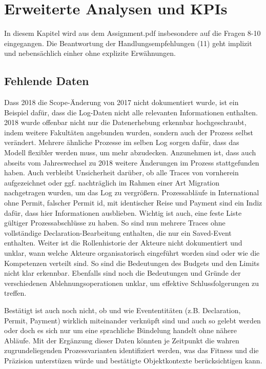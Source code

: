\section{Erweiterte Analysen und KPIs}
\label{sec:erweitert}
In diesem Kapitel wird aus dem Assignment.pdf insbesondere auf die Fragen 8-10 eingegangen. Die Beantwortung der Handlungsempfehlungen (11) geht implizit und nebensächlich einher ohne explizite Erwähnungen.

\subsection{Fehlende Daten}
\label{sec:fehlende_daten}
Dass 2018 die Scope-Änderung von 2017 nicht dokumentiert wurde, ist ein Beispiel dafür, dass die Log-Daten nicht alle relevanten Informationen enthalten.
2018 wurde offenbar nicht nur die Datenerhebung erkennbar hochgeschraubt, indem weitere Fakultäten angebunden wurden, sondern auch der Prozess selbst verändert.
Mehrere ähnliche Prozesse im selben Log sorgen dafür, dass das Modell flexibler werden muss, um mehr abzudecken.
Anzunehmen ist, dass auch abseits vom Jahreswechsel zu 2018 weitere Änderungen im Prozess stattgefunden haben.
Auch verbleibt Unsicherheit darüber, ob alle Traces von vornherein aufgezeichnet oder ggf. nachträglich im Rahmen einer Art Migration nachgetragen wurden, um das Log zu vergrößern.
Prozessabläufe in International ohne Permit, falscher Permit id, mit identischer Reise und Payment sind ein Indiz dafür, dass hier Informationen ausblieben.
Wichtig ist auch, eine feste Liste gültiger Prozessabschlüsse zu haben. So sind nun mehrere Traces ohne vollständige Declaration-Bearbeitung enthalten, die nur ein Saved-Event enthalten.
Weiter ist die Rollenhistorie der Akteure nicht dokumentiert und unklar, wann welche Akteure organisatorisch eingeführt worden sind oder wie die Kompetenzen verteilt sind.
So sind die Bedeutungen des Budgets und den Limits nicht klar erkennbar.
Ebenfalls sind noch die Bedeutungen und Gründe der verschiedenen Ablehnungsoperationen unklar, um effektive Schlussfolgerungen zu treffen. \par
Bestätigt ist auch noch nicht, ob und wie Evententitäten (z.B. Declaration, Permit, Payment) wirklich miteinander verknüpft sind und auch so gelebt werden oder doch es sich nur um eine sprachliche Bündelung handelt ohne nähere Abläufe.
Mit der Ergänzung dieser Daten könnten je Zeitpunkt die wahren zugrundeliegenden Prozessvarianten identifiziert werden, was das Fitness und die Präzision unterstüzen würde und bestätigte Objektkontexte berücksichtigen kann.


